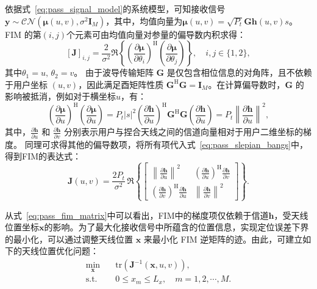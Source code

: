 依据式~\eqref{eq:pass_signal_model}的系统模型，可知接收信号$\bm{y} \sim \mathcal{CN}(\bm{\mu}(u,v), \sigma^2 \bm{I}_M)$，其中，均值向量为$\bm{\mu}(u,v) = \sqrt{P_t} \bm{G} \bm{h}(u,v) s$。
FIM 的第$(i,j)$个元素可由均值向量对参量的偏导数内积求得：
\begin{equation}\label{eq:pass_slepian_bangs}
	[\bm{J}]_{i,j} = \frac{2}{\sigma^2} \Re \left\{ \left( \frac{\partial \bm{\mu}}{\partial \theta_i} \right)^{\mathrm{H}} \left( \frac{\partial \bm{\mu}}{\partial \theta_j} \right) \right\}, \quad i, j \in \{1, 2\},
\end{equation}
其中$\theta_1 = u,\, \theta_2 = v$。
由于波导传输矩阵 $\bm{G}$ 是仅包含相位信息的对角阵，且不依赖于用户坐标 $(u,v)$，因此满足酉矩阵性质 $\bm{G}^{\mathrm{H}}\bm{G} = \bm{I}_M$。在计算偏导数时，$\bm{G}$ 的影响被抵消，例如对于横坐标$u$，有：
\begin{equation}\label{eq:pass_fim_deriv}
	\left( \frac{\partial \bm{\mu}}{\partial u} \right)^{\mathrm{H}} \left( \frac{\partial \bm{\mu}}{\partial u} \right) = P_t |s|^2 \left( \frac{\partial \bm{h}}{\partial u} \right)^{\mathrm{H}} \bm{G}^{\mathrm{H}} \bm{G} \left( \frac{\partial \bm{h}}{\partial u} \right) = P_t \left\| \frac{\partial \bm{h}}{\partial u} \right\|^2,
\end{equation}
其中，$\frac{\partial \bm{h}}{\partial u}$ 和 $\frac{\partial \bm{h}}{\partial v}$ 分别表示用户与捏合天线之间的信道向量相对于用户二维坐标的梯度。
同理可求得其他的偏导数项，将所有项代入式~\eqref{eq:pass_slepian_bangs}中，得到FIM的表达式：
\begin{equation}\label{eq:pass_fim_matrix}
	\bm{J}(u,v) = \frac{2 P_t}{\sigma^2} \,
	\Re \left\{
	\begin{bmatrix}
		\left\| \frac{\partial \bm{h}}{\partial u} \right\|^2 & \left( \frac{\partial \bm{h}}{\partial u} \right)^{\mathrm{H}} \frac{\partial \bm{h}}{\partial v} \\
		\left( \frac{\partial \bm{h}}{\partial v} \right)^{\mathrm{H}} \frac{\partial \bm{h}}{\partial u} & \left\| \frac{\partial \bm{h}}{\partial v} \right\|^2
	\end{bmatrix}
	\right\}.
\end{equation}

从式~\eqref{eq:pass_fim_matrix}中可以看出，FIM中的梯度项仅依赖于信道$\bm{h}$，受天线位置坐标$\bm{x}$的影响。为了最大化接收信号中所蕴含的位置信息，实现定位误差下界的最小化，可以通过调整天线位置 $\bm{x}$ 来最小化 FIM 逆矩阵的迹。由此，可建立如下的天线位置优化问题：
\begin{equation}\label{eq:pass_prob_p1}
	\begin{aligned}
		\min_{\bm{x}} \quad & \mathrm{tr}\left( \bm{J}^{-1}(\bm{x}, u, v) \right), \\
		\text{s.t.} \quad & 0 \leq x_m \leq L_x, \quad m = 1, 2, \cdots, M.
	\end{aligned}
\end{equation}

